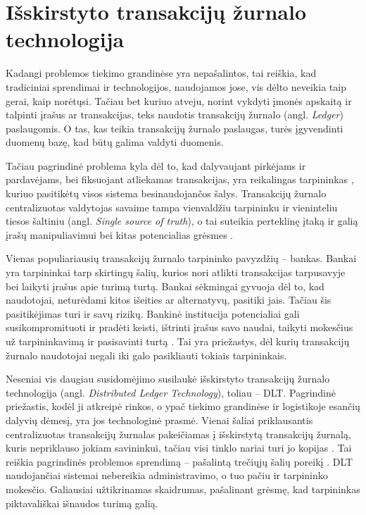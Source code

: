 
\section {Išskirstyto transakcijų žurnalo technologija}

Kadangi problemos tiekimo grandinėse yra nepašalintos, tai reiškia, kad tradiciniai sprendimai ir technologijos, naudojamos jose, vis dėlto neveikia taip gerai, kaip norėtųsi. Tačiau bet kuriuo atveju, norint vykdyti įmonės apskaitą ir talpinti įrašus ar transakcijas, teks naudotis transakcijų žurnalo (angl. \textit{Ledger}) paslaugomis. O tas, kas teikia transakcijų žurnalo paslaugas, turės įgyvendinti duomenų bazę, kad būtų galima valdyti duomenis.

Tačiau pagrindinė problema kyla dėl to, kad dalyvaujant pirkėjams ir pardavėjams, bei fiksuojant atliekamas transakcijas, yra reikalingas tarpininkas \cite{gao2018coc}, kuriuo pasitikėtų visos sistema besinaudojančos šalys. Transakcijų žurnalo centralizuotas valdytojas savaime tampa vienvaldžiu tarpininku ir vieninteliu tiesos šaltiniu (angl. \textit{Single source of truth}), o tai suteikia perteklinę įtaką ir galią įrašų manipuliavimui bei kitas potencialias grėsmes \cite{jiang2017much, shyamasundar2018blockchain}. 

Vienas populiariausių transakcijų žurnalo tarpininko pavyzdžių – bankas. Bankai yra tarpininkai tarp skirtingų šalių, kurios nori atlikti transakcijas tarpusavyje bei laikyti įrašus apie turimą turtą. Bankai sėkmingai gyvuoja dėl to, kad naudotojai, neturėdami kitos išeities ar alternatyvų, pasitiki jais. Tačiau šis pasitikėjimas turi ir savų rizikų. Bankinė institucija potencialiai gali susikompromituoti ir pradėti keisti, ištrinti įrašus savo naudai, taikyti mokesčius už tarpininkavimą ir pasisavinti turtą \cite{shyamasundar2018blockchain}. Tai yra priežastys, dėl kurių transakcijų žurnalo naudotojai negali iki galo pasikliauti tokiais tarpininkais.

Neseniai vis daugiau susidomėjimo susilaukė išskirstyto transakcijų žurnalo technologija (angl. \textit{Distributed Ledger Technology}), toliau – DLT. Pagrindinė priežastis, kodėl ji atkreipė rinkos, o ypač tiekimo grandinėse ir logistikoje esančių dalyvių dėmesį, yra jos technologinė prasmė. Vienai šaliai priklausantis centralizuotas transakcijų žurnalas pakeičiamas į išskirstytą transakcijų žurnalą, kuris nepriklauso jokiam savininkui, tačiau visi tinklo nariai turi jo kopijas \cite{shyamasundar2018blockchain}. Tai reiškia pagrindinės problemos sprendimą – pašalintą trečiųjų šalių poreikį \cite{shyamasundar2018blockchain}. DLT naudojančiai sistemai nebereikia administravimo, o tuo pačiu ir tarpininko mokesčio. Galiausiai užtikrinamas skaidrumas, pašalinant grėsmę, kad tarpininkas piktavališkai išnaudos turimą galią.



